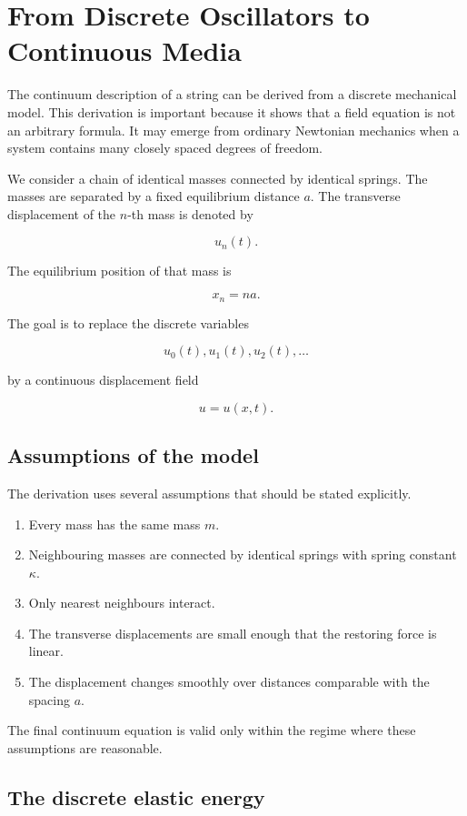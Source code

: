 \section{From Discrete Oscillators to Continuous Media}
\label{sec:discrete_to_continuum}

The continuum description of a string can be derived from a discrete mechanical model. This derivation is important because it shows that a field equation is not an arbitrary formula. It may emerge from ordinary Newtonian mechanics when a system contains many closely spaced degrees of freedom.

We consider a chain of identical masses connected by identical springs. The masses are separated by a fixed equilibrium distance \(a\). The transverse displacement of the \(n\)-th mass is denoted by

\[
u_{n}(t).
\]

The equilibrium position of that mass is

\[
x_{n}=na.
\]

The goal is to replace the discrete variables

\[
u_{0}(t),u_{1}(t),u_{2}(t),\ldots
\]

by a continuous displacement field

\[
u=u(x,t).
\]

\subsection{Assumptions of the model}

The derivation uses several assumptions that should be stated explicitly.

\begin{enumerate}
    \item Every mass has the same mass \(m\).
    \item Neighbouring masses are connected by identical springs with spring constant \(\kappa\).
    \item Only nearest neighbours interact.
    \item The transverse displacements are small enough that the restoring force is linear.
    \item The displacement changes smoothly over distances comparable with the spacing \(a\).
\end{enumerate}

The final continuum equation is valid only within the regime where these assumptions are reasonable.

\subsection{The discrete elastic energy}


